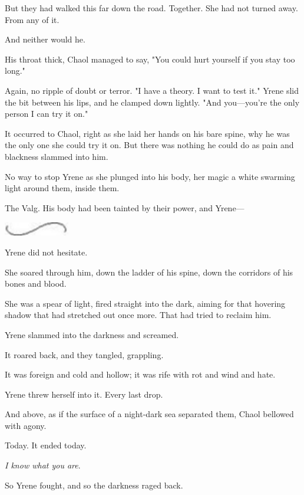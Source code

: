 But they had walked this far down the road.
Together.
She had not turned away.
From any of it.

And neither would he.

His throat thick, Chaol managed to say, "You could hurt yourself if you stay too long."

Again, no ripple of doubt or terror.
"I have a theory.
I want to test it."
Yrene slid the bit between his lips, and he clamped down lightly.
"And you---you're the only person I can try it on."

It occurred to Chaol, right as she laid her hands on his bare spine, why he was the only one she could try it on.
But there was nothing he could do as pain and blackness slammed into him.

No way to stop Yrene as she plunged into his body, her magic a white swarming light around them, inside them.

The Valg.
His body had been tainted by their power, and Yrene---

\begin{center}
	\includegraphics[width=1.12in,height=0.24in]{images/seperator}
\end{center}

Yrene did not hesitate.

She soared through him, down the ladder of his spine, down the corridors of his bones and blood.

She was a spear of light, fired straight into the dark, aiming for that hovering shadow that had stretched out once more.
That had tried to reclaim him.

Yrene slammed into the darkness and screamed.

It roared back, and they tangled, grappling.

It was foreign and cold and hollow; it was rife with rot and wind and hate.

Yrene threw herself into it.
Every last drop.

And above, as if the surface of a night-dark sea separated them, Chaol bellowed with agony.

Today.
It ended today.

\emph{I know what you are}.

So Yrene fought, and so the darkness raged back.

